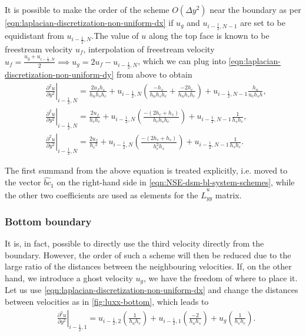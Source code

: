 \documentclass{article}
\numberwithin{equation}{section}
\begin{document}
It is possible to make the order of the scheme $O(\Delta y^2)$ near the boundary as per \cref{eqn:laplacian-discretization-non-uniform-dx} if $u_g$ and $u_{i-\frac{1}{2},N-1}$ are set to be equidistant from $u_{i-\frac{1}{2},N}$.The value of $u$ along the top face is known to be freestream velocity $u_{{f}}$, interpolation of freestream velocity $u_{f} = \frac{u_g+u_{i-\frac{1}{2},N}}{2}\implies u_g=2u_{f}-u_{i-\frac{1}{2},N}$, which we can plug into \cref{eqn:laplacian-discretization-non-uniform-dy} from above to obtain
\begin{equation}
\begin{aligned}
& \left.\frac{\partial ^2 u}{\partial y^2}\right|_{i-\frac{1}{2},N}=\frac{2 u_f h_s}{h_n h_s h_c}+u_{i-\frac{1}{2},N}\left(\frac{-h_s}{h_n h_s h_c}+\frac{-2 h_c}{h_n h_s h_c}\right)+u_{i-\frac{1}{2},N-1} \frac{h_n}{u_c h_s h},\\
& \left.\frac{\partial^2 u}{\partial y^2}\right|_{i-\frac{1}{2},N}=\frac{2 u_f}{h_c h_c}+u_{i-\frac{1}{2},N}\left(\frac{-\left(2 h_c+h_s\right)}{h_c h_s h_c}\right)+u_{i-\frac{1}{2},N-1} \frac{1}{h_s h_c}, \\
& \left.\frac{\partial^2 u}{\partial y^2}\right|_{i-\frac{1}{2},N}=\frac{2 u_f}{h_c{ }^2}+u_{i-\frac{1}{2},N}\left(\frac{-\left(2 h_c+h_s\right)}{h_c^2 h_s}\right)+u_{i-\frac{1}{2},N-1} \frac{1}{h_s h_c}.
\end{aligned}
\end{equation}

The first summand from the above equation is treated explicitly, i.e. moved to the vector $\hat{bc}_1$ on the right-hand side in \cref{eqn:NSE-dsm-bl-system-schemes}, while the other two coefficients are used as elements for the $\hat{L}^u_{yy}$ matrix.

\subsubsection{Bottom boundary}\label{subsubsec:laplacian-bottom}
It is, in fact, possible to directly use the third velocity directly from the boundary. However, the order of such a scheme will then be reduced due to the large ratio of the distances between the neighbouring velocities. If, on the other hand, we introduce a ghost velocity $u_g$, we have the freedom of where to place it. Let us use \cref{eqn:laplacian-discretization-non-uniform-dx} and change the distances between velocities as in \cref{fig:luxx-bottom}, which leads to
\begin{equation}
\begin{aligned}
&\left.\frac{\partial^ 2 u}{\partial y^2}\right|_{i-\frac{1}{2},1}=u_{i-\frac{1}{2},2}\left(\frac{1}{h_n h_c}\right)+u_{i-\frac{1}{2},1}\left(\frac{-2}{h_n h_s}\right)+u_g\left(\frac{1}{h_s h_c}\right).\\
\end{aligned}
\end{equation}
\end{document}

